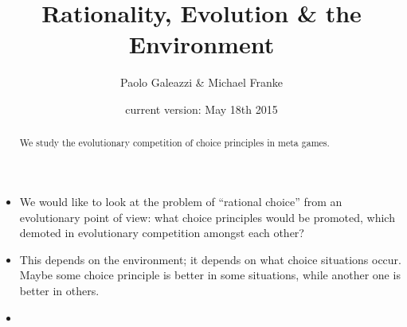\documentclass[fleqn,reqno,10pt]{article}
\title{Rationality, Evolution \& the Environment}
\author{Paolo Galeazzi \& Michael Franke}
\date{current version: May 18th 2015}
\begin{document}
\maketitle

\begin{abstract}
  We study the evolutionary competition of choice principles in meta games.
\end{abstract}

\begin{itemize}
\item We would like to look at the problem of ``rational choice'' from an evolutionary point of
  view: what choice principles would be promoted, which demoted in evolutionary competition
  amongst each other?
\item This depends on the environment; it depends on what choice situations occur. Maybe some
  choice principle is better in some situations, while another one is better in others. 
\item 

\end{itemize}

\printbibliography[heading=bibintoc]
\end{document}
